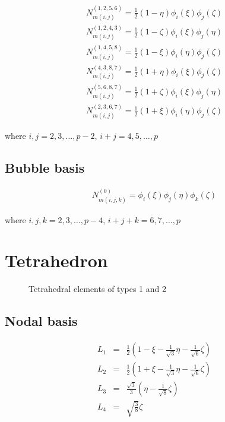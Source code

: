 \begin{eqnarray*}
N_{m(i,j)}^{(1,2,5,6)}=\frac{1}{2}(1-\eta)\phi_i(\xi)\phi_j(\zeta) \\
N_{m(i,j)}^{(1,2,4,3)}=\frac{1}{2}(1-\zeta)\phi_i(\xi)\phi_j(\eta) \\
N_{m(i,j)}^{(1,4,5,8)}=\frac{1}{2}(1-\xi)\phi_i(\eta)\phi_j(\zeta) \\
N_{m(i,j)}^{(4,3,8,7)}=\frac{1}{2}(1+\eta)\phi_i(\xi)\phi_j(\zeta) \\
N_{m(i,j)}^{(5,6,8,7)}=\frac{1}{2}(1+\zeta)\phi_i(\xi)\phi_j(\eta) \\
N_{m(i,j)}^{(2,3,6,7)}=\frac{1}{2}(1+\xi)\phi_i(\eta)\phi_j(\zeta)
\end{eqnarray*}

\noindent where $i,j=2,3,\ldots,p-2$, $i+j=4,5,\ldots,p$

\subsection{Bubble basis}

\begin{eqnarray*}
N_{m(i,j,k)}^{(0)}=\phi_i(\xi)\phi_j(\eta)\phi_k(\zeta)
\end{eqnarray*}

\noindent where $i,j,k=2,3,\ldots,p-4$, $i+j+k=6,7,\ldots,p$

\section{Tetrahedron}

\begin{figure}[tbhp]
\begin{minipage}{.5\textwidth}
\begin{center}

\end{center}
\end{minipage}
\begin{minipage}{.5\textwidth}
\begin{center}

\end{center}
\end{minipage}
\caption{Tetrahedral elements of types 1 and 2}
\end{figure}

\subsection{Nodal basis}

\begin{eqnarray*}
L_1&=&\frac{1}{2}(1-\xi-\frac{1}
{\sqrt{3}}\eta-\frac{1}{\sqrt{6}}\zeta) \\
L_2&=&\frac{1}{2}(1+\xi-\frac{1}
{\sqrt{3}}\eta-\frac{1}{\sqrt{6}}\zeta) \\
L_3&=&\frac{\sqrt{3}}{3}(\eta-\frac{1}{\sqrt{8}}\zeta) \\
L_4&=&\sqrt{\frac{3}{8}}\zeta
\end{eqnarray*}

